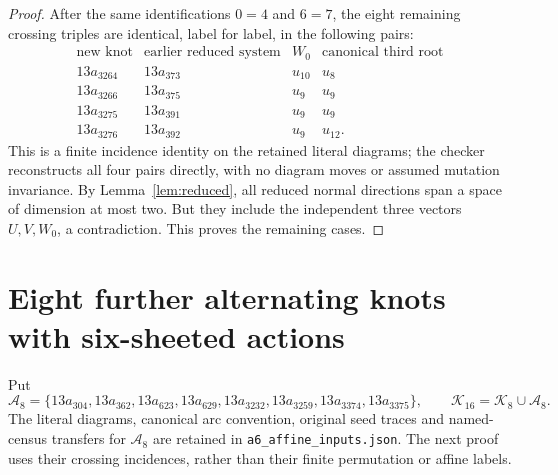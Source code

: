 \documentclass[11pt]{article}
\begin{document}
\begin{proof}
After the same identifications $0=4$ and $6=7$, the eight remaining
crossing triples are identical, label for label, in the following pairs:
\[
\begin{array}{c|c|c|c}
\text{new knot}&\text{earlier reduced system}&W_0&
   \text{canonical third root}\\\hline
13a_{3264}&13a_{373}&u_{10}&u_8\\
13a_{3266}&13a_{375}&u_9&u_9\\
13a_{3275}&13a_{391}&u_9&u_9\\
13a_{3276}&13a_{392}&u_9&u_{12}.
\end{array}
\]
This is a finite incidence identity on the retained literal diagrams;
the checker reconstructs all four pairs directly, with no diagram
moves or assumed mutation invariance. By Lemma~\ref{lem:reduced},
all reduced normal directions span a space of dimension at most two.
But they include the independent three vectors $U,V,W_0$, a
contradiction. This proves the remaining cases.
\end{proof}

\section{Eight further alternating knots with six-sheeted actions}

Put
\[
\mathcal A_8=\{13a_{304},13a_{362},13a_{623},13a_{629},
13a_{3232},13a_{3259},13a_{3374},13a_{3375}\},\qquad
\mathcal K_{16}=\mathcal K_8\cup\mathcal A_8.
\]
The literal diagrams, canonical arc convention, original seed traces
and named-census transfers for $\mathcal A_8$ are retained in
\texttt{a6\_affine\_inputs.json}. The next proof uses their crossing
incidences, rather than their finite permutation or affine labels.
\end{document}

